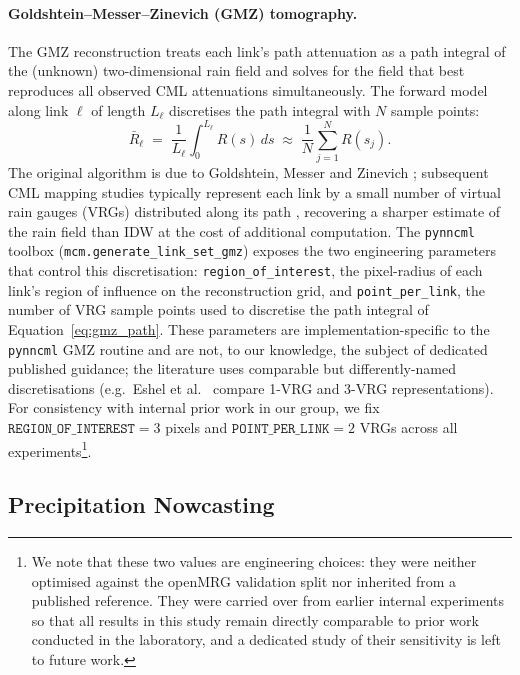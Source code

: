 \documentclass[12pt, a4paper]{article}
\begin{document}
\paragraph{Goldshtein--Messer--Zinevich (GMZ) tomography.}
The GMZ reconstruction treats each link's path attenuation as a path
integral of the (unknown) two-dimensional rain field and solves for the
field that best reproduces all observed CML attenuations
simultaneously. The forward model along link \(\ell\) of length
\(L_\ell\) discretises the path integral with \(N\) sample points:
\begin{equation}
  \bar{R}_\ell \;=\;
  \frac{1}{L_\ell}\int_0^{L_\ell}\! R(s)\, ds
  \;\approx\;
  \frac{1}{N}\sum_{j=1}^{N} R(s_j). \label{eq:gmz_path}
\end{equation}
The original algorithm is due to Goldshtein, Messer and Zinevich
\cite{goldshtein2009}; subsequent CML mapping studies typically
represent each link by a small number of virtual rain gauges (VRGs)
distributed along its path \cite{eshel2021spatial}, recovering a
sharper estimate of the rain field than IDW at the cost of additional
computation. The \texttt{pynncml} toolbox
(\texttt{mcm.generate\_link\_set\_gmz}) exposes the two engineering
parameters that control this discretisation:
\texttt{region\_of\_interest}, the pixel-radius of each link's region
of influence on the reconstruction grid, and \texttt{point\_per\_link},
the number of VRG sample points used to discretise the path integral
of Equation~\eqref{eq:gmz_path}. These parameters are
implementation-specific to the \texttt{pynncml} GMZ routine and are
not, to our knowledge, the subject of dedicated published guidance;
the literature uses comparable but differently-named discretisations
(e.g.\ Eshel et al.\ \cite{eshel2021spatial} compare 1-VRG and 3-VRG
representations). For consistency with internal prior work in our
group, we fix \(\texttt{REGION\_OF\_INTEREST}=3\) pixels and
\(\texttt{POINT\_PER\_LINK}=2\) VRGs across all experiments\footnote{We
note that these two values are engineering choices: they were neither
optimised against the openMRG validation split nor inherited from a
published reference. They were carried over from earlier internal
experiments so that all results in this study remain directly
comparable to prior work conducted in the laboratory, and a dedicated
study of their sensitivity is left to future work.}.

\subsection{Precipitation Nowcasting}
\end{document}
